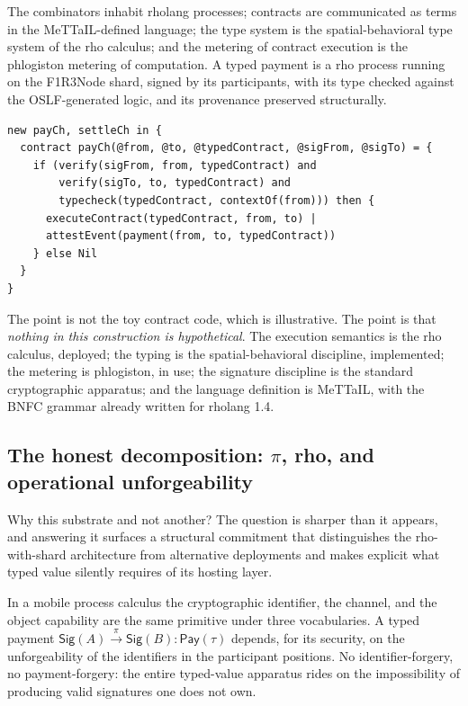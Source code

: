 \documentclass[11pt]{article}
\newcommand{\Sig}{\mathsf{Sig}}
\newcommand{\Pay}{\mathsf{Pay}}
\begin{document}
The combinators inhabit rholang processes; contracts are communicated as terms in the MeTTaIL-defined language; the type system is the spatial-behavioral type system of the rho calculus; and the metering of contract execution is the phlogiston metering of computation. A typed payment is a rho process running on the F1R3Node shard, signed by its participants, with its type checked against the OSLF-generated logic, and its provenance preserved structurally.

\begin{lstlisting}[language=rholang,caption={A typed payment in MeTTaIL, schematic.}]
new payCh, settleCh in {
  contract payCh(@from, @to, @typedContract, @sigFrom, @sigTo) = {
    if (verify(sigFrom, from, typedContract) and
        verify(sigTo, to, typedContract) and
        typecheck(typedContract, contextOf(from))) then {
      executeContract(typedContract, from, to) |
      attestEvent(payment(from, to, typedContract))
    } else Nil
  }
}
\end{lstlisting}

The point is not the toy contract code, which is illustrative. The point is that \emph{nothing in this construction is hypothetical}. The execution semantics is the rho calculus, deployed; the typing is the spatial-behavioral discipline, implemented; the metering is phlogiston, in use; the signature discipline is the standard cryptographic apparatus; and the language definition is MeTTaIL, with the BNFC grammar already written for rholang 1.4.

\subsection{The honest decomposition: $\pi$, rho, and operational unforgeability}\label{sec:rho-vs-pi}

Why this substrate and not another? The question is sharper than it appears, and answering it surfaces a structural commitment that distinguishes the rho-with-shard architecture from alternative deployments and makes explicit what typed value silently requires of its hosting layer.

In a mobile process calculus the cryptographic identifier, the channel, and the object capability are the same primitive under three vocabularies. A typed payment $\Sig(A) \xrightarrow{\pi} \Sig(B) : \Pay(\tau)$ depends, for its security, on the unforgeability of the identifiers in the participant positions. No identifier-forgery, no payment-forgery: the entire typed-value apparatus rides on the impossibility of producing valid signatures one does not own.
\end{document}
